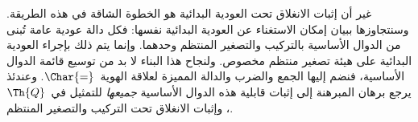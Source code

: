 \documentclass[../../../include/open-logic-section]{subfiles}
\begin{document}
غير أن إثبات الانغلاق تحت العودية البدائية هو الخطوة الشاقة في هذه
الطريقة. وسنتجاوزها ببيان إمكان الاستغناء عن العودية البدائية نفسها:
فكل دالة عودية عامة تُبنى من الدوال الأساسية بالتركيب والتصغير المنتظم
وحدهما. وإنما يتم ذلك بإجراء العودية البدائية على هيئة تصغير منتظم
مخصوص. ولنجاح هذا البناء لا بد من توسيع قائمة الدوال الأساسية، فنضم
إليها الجمع والضرب والدالة المميزة لعلاقة الهوية~$\Char{=}$.
وعندئذ يرجع برهان المبرهنة إلى إثبات قابلية هذه الدوال الأساسية
\emph{جميعها} للتمثيل في~$\Th{Q}$، وإثبات الانغلاق تحت التركيب
والتصغير المنتظم.
\end{document}
